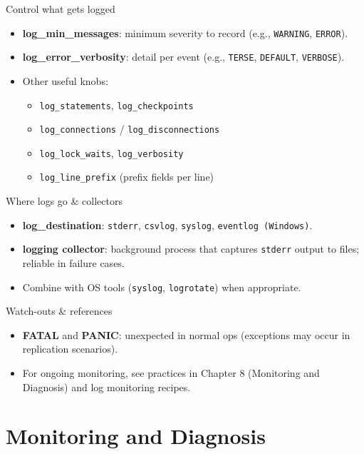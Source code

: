 \documentclass[aspectratio=169]{beamer}
\begin{document}
\begin{frame}{Control what gets logged}
  \begin{itemize}
    \item \textbf{log\_min\_messages}: minimum severity to record (e.g., \texttt{WARNING}, \texttt{ERROR}).
    \item \textbf{log\_error\_verbosity}: detail per event (e.g., \texttt{TERSE}, \texttt{DEFAULT}, \texttt{VERBOSE}).
    \item Other useful knobs:
      \begin{itemize}
        \item \texttt{log\_statements}, \texttt{log\_checkpoints}
        \item \texttt{log\_connections} / \texttt{log\_disconnections}
        \item \texttt{log\_lock\_waits}, \texttt{log\_verbosity}
        \item \texttt{log\_line\_prefix} (prefix fields per line)
      \end{itemize}
  \end{itemize}
\end{frame}

\begin{frame}{Where logs go \& collectors}
  \begin{itemize}
    \item \textbf{log\_destination}: \texttt{stderr}, \texttt{csvlog}, \texttt{syslog}, \texttt{eventlog (Windows)}.
    \item \textbf{logging collector}: background process that captures \texttt{stderr} output to files; reliable in failure cases.
    \item Combine with OS tools (\texttt{syslog}, \texttt{logrotate}) when appropriate.
  \end{itemize}
\end{frame}

\begin{frame}{Watch-outs \& references}
  \begin{itemize}
    \item \textbf{FATAL} and \textbf{PANIC}: unexpected in normal ops (exceptions may occur in replication scenarios).
    \item For ongoing monitoring, see practices in Chapter 8 (Monitoring and Diagnosis) and log monitoring recipes.
  \end{itemize}
\end{frame}

\section{Monitoring and Diagnosis}
\end{document}
